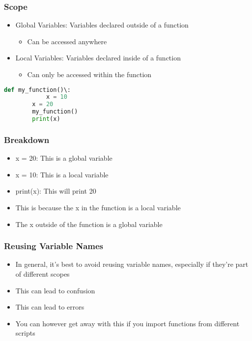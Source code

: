 \documentclass[serif, 9pt, aspectratio=32]{beamer}
\begin{document}
\begin{frame}
    \centering
    \frametitle{Scope}
    \begin{itemize}
        \setlength{\itemsep}{3em}
        \item Global Variables: Variables declared outside of a function
              \begin{itemize}
                  \item Can be accessed anywhere
              \end{itemize}
        \item Local Variables: Variables declared inside of a function
              \begin{itemize}
                  \item Can only be accessed within the function
              \end{itemize}
    \end{itemize}
\end{frame}

\begin{frame}[fragile]
    \begin{lstlisting}[language=Python]
        def my_function()\:
            x = 10
        x = 20
        my_function()
        print(x)
    \end{lstlisting}
\end{frame}

\begin{frame}
    \centering
    \frametitle{Breakdown}
    \begin{itemize}
        \setlength{\itemsep}{3em}
        \item x = 20: This is a global variable
        \item x = 10: This is a local variable
        \item print(x): This will print 20
        \item This is because the x in the function is a local variable
        \item The x outside of the function is a global variable
    \end{itemize}
\end{frame}

\begin{frame}
    \centering
    \frametitle{Reusing Variable Names}
    \begin{itemize}
        \setlength{\itemsep}{3em}
        \item In general, it's best to avoid reusing variable names, especially if they're part of different scopes
        \item This can lead to confusion
        \item This can lead to errors
        \item You can however get away with this if you import functions from different scripts
    \end{itemize}
\end{frame}
\end{document}
